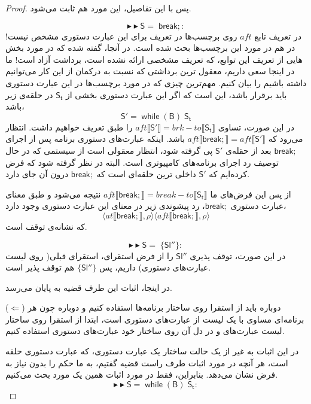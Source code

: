 \begin{proof}
پس با این تفاصیل، این مورد هم ثابت می‌شود.

$$\blacktriangleright\blacktriangleright \mathsf{S=\; break;}:$$
در تعریف تابع $aft$ روی برچسب‌ها در \cite{calcul} تعریف برای این عبارت‌ دستوری مشخص نیست! در \cite{cousotbook} هم در مورد این برچسب‌ها بحث شده است. در آنجا، گفته شده که در مورد بخش هایی از تعریف این توابع، که تعریف مشخصی ارائه نشده است، برداشت آزاد است! ما در اینجا سعی داریم، معقول ترین برداشتی که نسبت به درکمان از این کار می‌توانیم داشته باشیم را بیان کنیم. مهم‌ترین چیزی که در مورد برچسب‌ها در این عبارت‌ دستوری باید برقرار باشد، این است که اگر این عبارت‌ دستوری بخشی از $\mathsf{S_t}$ در حلقه‌ی زیر باشد،
$$\mathsf{S'=\; while\; (B)\; S_t}$$
در این صورت، تساوی 
$aft \llbracket \mathsf{S'} \rrbracket = brk-to \llbracket \mathsf{S_t} \rrbracket $
را طبق تعریف خواهیم داشت. انتظار می‌رود که\break 
$aft \llbracket \mathsf{break;} \rrbracket = aft \llbracket \mathsf{S'} \rrbracket$ 
باشد. اینکه عبارت‌های دستوری برنامه پس از اجرای $\mathsf{break;}$ بعد از حقله‌ی $\mathsf{S'}$ پی گرفته شود، انتظار معقولی است از سیستمی که در حال توصیف رد اجرای برنامه‌های کامپیوتری است. البته در نظر گرفته شود که فرض کرده‌ایم که $\mathsf{S'}$ داخلی ترین حلقه‌ای است که $\mathsf{break;}$ درون آن جای دارد.

 از پس این فرض‌های ما 
$aft \llbracket \mathsf{break;} \rrbracket = break-to \llbracket \mathsf{S_t} \rrbracket$ 
نتیجه می‌شود و طبق معنای عبارت دستوری 
$\mathsf{break;}$،
رد پیشوندی زیر در معنای این عبارت‌ دستوری وجود دارد،
$$\langle at \llbracket \mathsf{break;} \rrbracket , \rho \rangle
\langle aft \llbracket \mathsf{break;} \rrbracket , \rho \rangle$$
 که نشانه‌ی توقف است.
 

$$\blacktriangleright\blacktriangleright \mathsf{S=\; \{ Sl'' \}}:$$
	در این صورت، توقف پذیری $\mathsf{Sl''}$ را از فرض استقرای، استقرای قبلی( روی لیست عبارت‌های دستوری) داریم، پس $\mathsf{\{Sl''\}}$ هم توقف پذیر است.
	
	
در اینجا، اثبات این طرف قضیه به پایان می‌رسد.

($\Leftarrow$)
دوباره باید از استقرا روی ساختار برنامه‌ها استفاده کنیم و دوباره چون هر برنامه‌ای مساوی با یک لیست از عبارت‌های دستوری است، ابتدا از استقرا روی ساختار لیست عبارت‌های و در دل آن روی ساختار خود عبارت‌های دستوری استفاده کنیم.

در این اثبات به غیر از یک حالت ساختار یک عبارت‌ دستوری، که عبارت‌ دستوری حلقه است، هر آنچه در مورد اثبات طرف راست قضیه گفتیم، به ما حکم را بدون نیاز به فرض نشان می‌دهد. بنابراین، فقط در مورد اثبات همین یک مورد بحث می‌کنیم. 
$$\blacktriangleright\blacktriangleright \mathsf{S=\; while\; (B)\; S_t}:$$


\end{proof}
